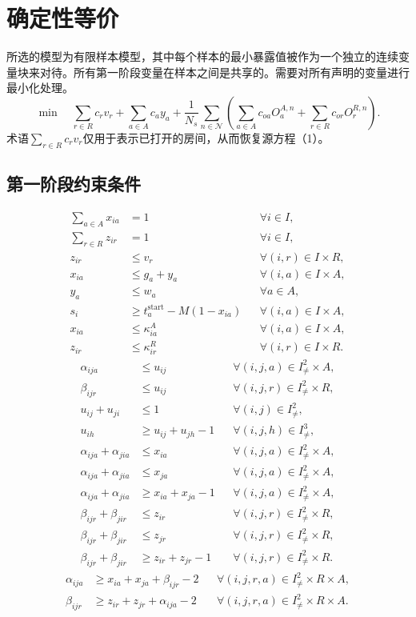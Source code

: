 \documentclass[11pt,a4paper]{article}
\begin{document}
\section*{确定性等价}
所选的模型为有限样本模型，其中每个样本的最小暴露值被作为一个独立的连续变量块来对待。所有第一阶段变量在样本之间是共享的。需要对所有声明的变量进行最小化处理。
\begin{equation}
\min\quad
\sum_{r\in R}c_r v_r+\sum_{a\in A}c_a y_a
+\frac{1}{N_s}\sum_{n\in\mathcal{N}}
\left(\sum_{a\in A}c_{oa}O_a^{A,n}
+\sum_{r\in R}c_{or}O_r^{R,n}\right).
\end{equation}
术语$\sum_{r\in R}c_rv_r$仅用于表示已打开的房间，从而恢复源方程（1）。

\subsection*{第一阶段约束条件}
\begin{align}
\sum_{a\in A}x_{ia}&=1 &&\forall i\in I,\\
\sum_{r\in R}z_{ir}&=1 &&\forall i\in I,\\
z_{ir}&\leq v_r &&\forall (i,r)\in I\times R,\\
x_{ia}&\leq g_a+y_a &&\forall (i,a)\in I\times A,\\
y_a&\leq w_a &&\forall a\in A,\\
s_i&\geq t_a^{\mathrm{start}}-M(1-x_{ia}) &&\forall (i,a)\in I\times A,\\
x_{ia}&\leq\kappa^A_{ia} &&\forall (i,a)\in I\times A,\\
z_{ir}&\leq\kappa^R_{ir} &&\forall (i,r)\in I\times R.
\end{align}
\begin{align}
\alpha_{ija}&\leq u_{ij} &&\forall (i,j,a)\in I^2_{\ne}\times A,\\
\beta_{ijr}&\leq u_{ij} &&\forall (i,j,r)\in I^2_{\ne}\times R,\\
u_{ij}+u_{ji}&\leq 1 &&\forall (i,j)\in I^2_{\ne},\\
u_{ih}&\geq u_{ij}+u_{jh}-1 &&\forall (i,j,h)\in I^3_{\ne},\\
\alpha_{ija}+\alpha_{jia}&\leq x_{ia} &&\forall (i,j,a)\in I^2_{\ne}\times A,\\
\alpha_{ija}+\alpha_{jia}&\leq x_{ja} &&\forall (i,j,a)\in I^2_{\ne}\times A,\\
\alpha_{ija}+\alpha_{jia}&\geq x_{ia}+x_{ja}-1 &&\forall (i,j,a)\in I^2_{\ne}\times A,\\
\beta_{ijr}+\beta_{jir}&\leq z_{ir} &&\forall (i,j,r)\in I^2_{\ne}\times R,\\
\beta_{ijr}+\beta_{jir}&\leq z_{jr} &&\forall (i,j,r)\in I^2_{\ne}\times R,\\
\beta_{ijr}+\beta_{jir}&\geq z_{ir}+z_{jr}-1 &&\forall (i,j,r)\in I^2_{\ne}\times R.
\end{align}
\begin{align}
\alpha_{ija}&\geq x_{ia}+x_{ja}+\beta_{ijr}-2
&&\forall (i,j,r,a)\in I^2_{\ne}\times R\times A,\\
\beta_{ijr}&\geq z_{ir}+z_{jr}+\alpha_{ija}-2
&&\forall (i,j,r,a)\in I^2_{\ne}\times R\times A.
\end{align}
\end{document}
